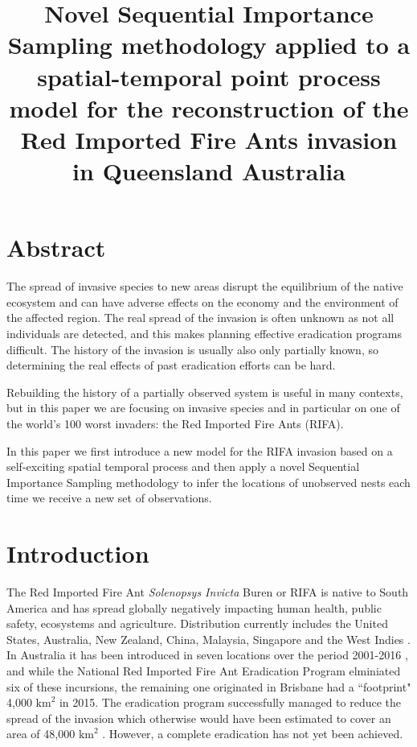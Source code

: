 \documentclass[11pt,a4paper]{article}
\title{Novel Sequential Importance Sampling methodology applied to a spatial-temporal point process model for the reconstruction of the Red Imported Fire Ants invasion in Queensland Australia}
\begin{document}
\maketitle

\section{Abstract}\label{section:abstract}
The spread of invasive species to new areas disrupt the equilibrium of the native ecosystem and can have adverse effects on the economy and the environment of the affected region. The real spread of the invasion is often unknown as not all individuals are detected, and this makes planning effective eradication programs difficult. The history of the invasion is usually also only partially known, so determining the real effects of past eradication efforts can be hard. 

Rebuilding the history of a partially observed system is useful in many contexts, but in this paper we are focusing on invasive species and in particular on one of the world's 100 worst invaders: the Red Imported Fire Ants (RIFA). 

In this paper we first introduce a new model for the RIFA invasion based on a self-exciting spatial temporal process and then apply a novel Sequential Importance Sampling methodology to infer the locations of unobserved nests each time we receive a new set of observations.



\section{Introduction}\label{section:introduction}
The Red Imported Fire Ant \textit{Solenopsys Invicta} Buren \cite{GISD} or RIFA is native to South America and has spread globally \cite{Wetterer} negatively impacting human health, public safety, ecosystems and agriculture. Distribution currently includes the United States, Australia, New Zealand, China, Malaysia, Singapore and the West Indies \cite{Wang} \cite{GISD}. In Australia it has been introduced in seven locations over the period 2001-2016 \cite{WylieMay16}, and while the National Red Imported Fire Ant Eradication Program elminiated six of these incursions, the remaining one originated in Brisbane had a ``footprint" 4,000 $\text{km}^2$ in 2015. The eradication program successfully managed to reduce the spread of the invasion which otherwise would have been estimated to cover an area of 48,000 $\text{km}^2$ \cite{Wylie2020}. However, a complete eradication has not yet been achieved. 
\end{document}
